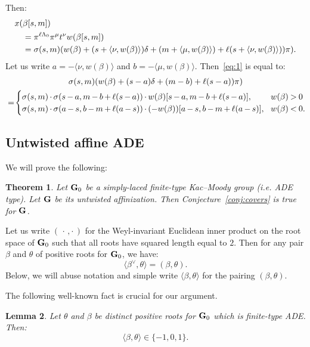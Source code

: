 \documentclass[10pt]{amsart}
\newtheorem{theo}{Theorem}[section]
\newtheorem{lemm}[theo]{Lemma}
\begin{document}
Then:
\begin{align}\label{eq:1}
x(&\beta[s,m])\\
&= \pi^{\ell \Lambda_0} \pi^{\mu} t^{\nu} w (\beta[s,m])\notag\\
&=\sigma(s,m) (w(\beta) + (s + \langle \nu, w(\beta) \rangle) \delta + (m + \langle \mu, w(\beta) \rangle) + \ell (s + \langle \nu, w(\beta) \rangle)) \pi).\notag
\end{align}
Let us write $a = -\langle \nu, w(\beta) \rangle$ and $b = -\langle \mu, w(\beta) \rangle$. Then~\eqref{eq:1} is equal to:
\begin{multline}\label{eq:3}
\sigma(s,m) (w(\beta) + (s - a) \delta + (m - b) + \ell (s - a)) \pi)\\
=\!
\begin{cases}
\sigma(s,m) \mk\cdot\mk \sigma(s\mk-\mk a,m\mk-\mk b\mk+\mk\ell(s\mk-\mk a)) \mk\cdot\mk w(\beta)[s\mk-\mk a, m\mk-\mk b \mk+\mk \ell(s\mk-\mk a)], & w(\beta) \mk>\mk 0 \\
\sigma(s,m) \mk\cdot\mk \sigma(a\mk-\mk s,b\mk-\mk m\mk+\mk\ell(a\mk-\mk s)) \mk\cdot\mk (-w(\beta))[a\mk-\mk s, b\mk-\mk m \mk+\mk \ell(a\mk-\mk s)],\! & w(\beta) \mk<\mk 0.
\end{cases}\!\!
\end{multline}

\subsection{Untwisted affine ADE}

We will prove the following:

\begin{theo}\label{thm:ade-covering}
Let $\mathbf{G}_0$ be a simply-laced finite-type Kac--Moody group (i.e. ADE type). Let $\mathbf{G}$ be its untwisted affinization. Then Conjecture~\ref{conj:covers} is true for $\mathbf{G}$.
\end{theo}

Let us write $(\,\cdot\,,\cdot\,)$ for the Weyl-invariant Euclidean inner product on the root space of $\mathbf{G}_0$ such that all roots have squared length equal to $2$. Then for any pair $\beta$ and $\theta$ of positive roots for $\mathbf{G}_0$, we have:
\begin{equation}\label{eq:16}
\langle \beta^\vee, \theta \rangle = (\beta, \theta).
\end{equation}
Below, we will abuse notation and simple write $\langle \beta, \theta \rangle$ for the pairing $(\beta, \theta)$.

The following well-known fact is crucial for our argument.
\begin{lemm}\label{lem:pairings-in-finite-ade}
Let $\theta$ and $\beta$ be distinct positive roots for $\mathbf{G}_0$ which is finite-type ADE. Then:
\begin{equation}\label{eq:9}
\langle \beta, \theta \rangle \in \{-1, 0, 1 \}.
\end{equation}
\end{lemm}
\end{document}
